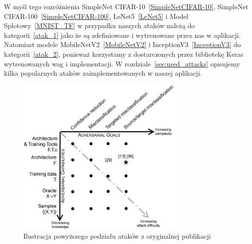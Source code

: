 \documentclass[
    left=2.5cm,         %
    right=2.5cm,        %
    top=2.5cm,          %
    bottom=3cm,         %
    bindingoffset=6mm,  %
    nohyphenation=false %
]{eiti/eiti-thesis}
\begin{document}
W myśl tego rozróżnienia SimpleNet CIFAR-10~\ref{SimpleNetCIFAR-10}, SimpleNet CIFAR-100~\ref{SimpleNetCIFAR-100},
LeNet5~\ref{LeNet5} i Model Splotowy~\ref{MNIST_TF} w przypadku naszych ataków należą do kategorii~\ref{atak_1} jako że są zdefiniowane i wytrenowane przez nas w aplikacji.
Natomiast modele MobileNetV2~\ref{MobileNetV2} i InceptionV3~\ref{InceptionV3} do kategorii~\ref{atak_2}, ponieważ korzystamy z dostarczonych przez bibliotekę Keras wytrenowanych wag i implementacji.
W rozdziale~\ref{sec:used_attacks} opisujemy kilka popularnych ataków zaimplementowanych w naszej aplikacji.

\begin{figure}[H]
    \begin{center}
        \includegraphics[width=0.75\textwidth]{eiti/attacks_taxonomy.png}
    \end{center}
    \caption{Ilustracja powyższego podziału ataków z oryginalnej publikacji~\cite{DBLP:journals/corr/PapernotMJFCS15}}
\end{figure}

\newpage
\end{document}
